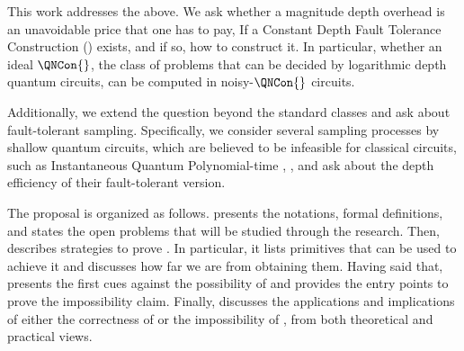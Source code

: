 This work addresses the above. We ask whether a magnitude depth overhead is an unavoidable price that one has to pay, If a Constant Depth Fault Tolerance Construction (\CDO{}) exists, and if so, how to construct it. In particular, whether an ideal $\QNCon{}$, the class of problems that can be decided by logarithmic depth quantum circuits, can be computed in noisy-$\QNCon{}$ circuits.

Additionally, we extend the question beyond the standard classes and ask about fault-tolerant sampling. Specifically, we consider several sampling processes by shallow quantum circuits, which are believed to be infeasible for classical circuits, such as Instantaneous Quantum Polynomial-time \cite{Bremner_2017}, \cite{Paletta_2024}, and ask about the depth efficiency of their fault-tolerant version.

%



  
  
The proposal is organized as follows.  presents the notations, formal definitions, and states the open problems that will be studied through the research. Then,  describes strategies to prove \CDO{}. In particular, it lists primitives that can be used to achieve it and discusses how far we are from obtaining them. Having said that,  presents the first cues against the possibility of \CDO{} and provides the entry points to prove the impossibility claim. Finally,  discusses the applications and implications of either the correctness of \CDO{} or the impossibility of \CDO{}, from both theoretical and practical views.
